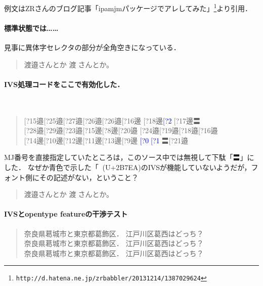 \documentclass{ltjsarticle}
\makeatletter
\def\ltj@ivs@out#1#2{#2\char\numexpr "E0100+#1\relax} %
\def\ltj@ivs@list?#1{\directlua{list_ivs('#1')}}
\def\ltj@ivs@grab@num{\expandafter\expandafter\expandafter\ltj@ivs@out\ltj@grab@num}
\def\ltj@ivs@nobracket{\@ifnextchar?{\ltj@ivs@list}{\ltj@ivs@grab@num}}
\def\ltj@ivs@bracket[#1]{\ltj@ivs@nobracket#1}
\def\IVS{\@ifnextchar[{\ltj@ivs@bracket}{\ltj@ivs@nobracket}}
\let\MJI=\IVS
\makeatother
\begin{document}

例文はZRさんのブログ記事「ipamjmパッケージでアレしてみた」\footnote{%
\verb+http://d.hatena.ne.jp/zrbabbler/20131214/1387029624+}より引用．

\paragraph{標準状態では……} 見事に異体字セレクタの部分が全角空きになっている．
\begin{quote}
\LARGE
渡邉󠄏さんとか%
渡𫟪󠄂さんとか。%
\end{quote}

\paragraph{IVS処理コードをここで有効化した．}\ 

\begin{quote}
\LARGE
\MJI15{邉}\MJI25{邉}\MJI27{邉}\MJI26{邉}\MJI26{邉}\MJI16{邊}
\MJI18{邊}\textcolor{blue}{\MJI2{𫟪}}\MJI17{邊}〓\\
\MJI28{邉}\MJI29{邉}\MJI23{邉}\MJI15{邊}\MJI8{邊}\MJI20{邉}
\MJI24{邉}\MJI19{邉}\MJI18{邉}\MJI16{邉}\\
\MJI14{邊}\MJI10{邊}\MJI12{邊}\MJI11{邊}\MJI13{邊}\MJI9{邊}
\textcolor{blue}{\MJI0{𫟪}}\textcolor{blue}{\MJI1{𫟪}}〓\MJI21{邉}
\end{quote}
MJ番号を直接指定していたところは，このソース中では無視して下駄「〓」にした．
なぜか青色で示した「𫟪」(U+2B7EA)のIVSが機能していないようだが，フォント側にその記述がない，ということ？

\begin{quote}
\LARGE
渡邉󠄏さんとか%
渡𫟪󠄂さんとか。%
\end{quote}


\def\TEST{%
  奈良県葛󠄀城市と東京都葛󠄁飾区．%
  江戸川区葛西はどっち？
}

\paragraph{IVSとopentype featureの干渉テスト}

\begin{quote}
 \Large
 {\TEST}\\
 {\TEST}\\
 {\TEST}
\end{quote}
\end{document}

